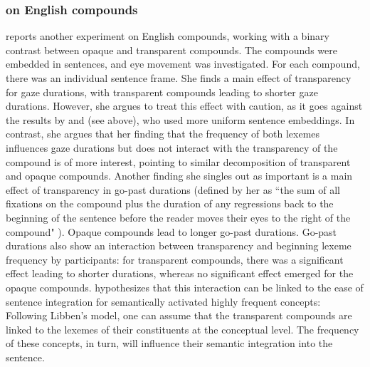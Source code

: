 \subsubsection{\citet{Juhasz:2007} on English compounds}
\label{sec:juhasz2007}

\citet{Juhasz:2007} reports another experiment on English compounds, working
with a binary contrast between opaque and transparent compounds. The compounds were
embedded in sentences, and eye movement was investigated. For each compound,
there was an individual sentence frame. She finds a main effect of
transparency for gaze durations, with transparent compounds leading to
shorter gaze durations. However, she argues to treat this effect with
caution, as it goes against the results by \citet{PollatsekandHyona:2005} and
\citet{Frissonetal:2008} (see above), who used more uniform sentence
embeddings. In contrast, she argues that her finding that the frequency of
both lexemes influences gaze durations but does not interact with the
transparency of the compound is of more interest, pointing to similar
decomposition of transparent and opaque compounds. 
 Another finding she singles
out as important is a main effect of transparency in go-past
durations (defined by her as ``the sum of all fixations on the
compound plus the duration of any regressions back to the beginning of
the sentence before the reader moves their eyes to the right of the
compound" \citealt[382]{Juhasz:2007}). Opaque compounds lead to longer
go-past durations. Go-past durations also show
an interaction between transparency and beginning lexeme frequency by
participants: for transparent compounds, there was a significant effect
leading to shorter durations, whereas no significant effect emerged
for the opaque compounds. \citet[385--386]{Juhasz:2007} hypothesizes that this
interaction can be linked to the ease of sentence integration for semantically
activated highly frequent concepts: Following Libben's \citeyearpar{Libben:1998} model, one can assume that the transparent compounds
are linked to the lexemes of their constituents at the conceptual
level. The frequency of these concepts, in turn, will influence their
semantic integration into the sentence.



